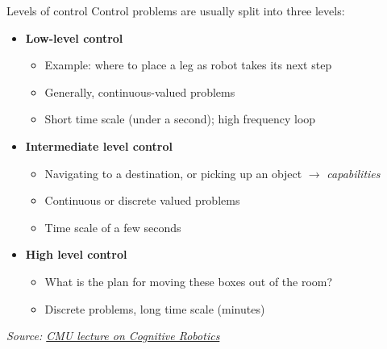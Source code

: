 \documentclass[compress]{beamer}
\newcommand{\source}[2]{{\tiny\it Source: \href{#1}{#2}}}
\begin{document}



\begin{frame}{Levels of control}
    Control problems are usually split into three levels:

    \begin{itemize}
        \item<1-> \textbf{Low-level control}
            \begin{itemize}
                \item Example: where to place a leg as robot takes its next step
                \item Generally, continuous-valued problems
                \item Short time scale (under a second); high frequency loop
            \end{itemize}
        \item<2-> \textbf{Intermediate level control}
            \begin{itemize}
                \item Navigating to a destination, or picking up an object
                    $\rightarrow$ \emph{capabilities}
                \item Continuous or discrete valued problems
                \item Time scale of a few seconds
            \end{itemize}
        \item<3-> \textbf{High level control}
            \begin{itemize}
                \item What is the plan for moving these boxes out of the room?
                \item Discrete problems, long time scale (minutes)
            \end{itemize}
    \end{itemize}

    \source{https://www.cs.cmu.edu/afs/cs/academic/class/15494-s11/lectures/architectures.pdf}{CMU lecture on Cognitive Robotics}
\end{frame}
\end{document}
